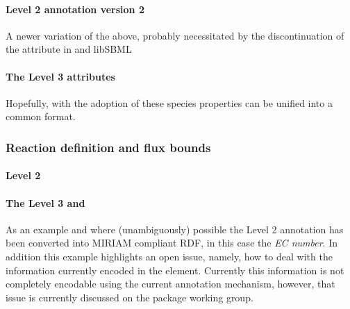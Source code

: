 \paragraph{\SBML Level 2 \Species annotation version 2}
A newer variation of the above, probably necessitated by the discontinuation of the  attribute in \SBML and \textsf{libSBML}
%

\paragraph{The \SBML Level 3 \Species attributes}
Hopefully, with the adoption of \SBML \FBC these species properties can be unified into a common format.
%

\subsubsection*{Reaction definition and flux bounds}
\paragraph{\SBML Level 2 \Reaction}
%

\paragraph{The \SBML Level 3 \Reaction and \FluxBound}

As an example and where (unambiguously) possible the \SBML Level 2 annotation has been converted into MIRIAM compliant RDF, in this case the \textit{EC number}. In addition this example highlights an open issue, namely, how to deal with the information currently encoded in the \Notes element. Currently this information is not completely encodable using the current \SBML annotation mechanism, however, that issue is currently discussed on the package working group.
%
%
